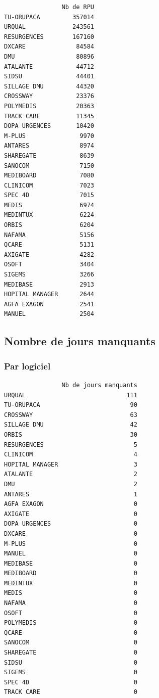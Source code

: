 \documentclass[]{article}
\begin{document}
\begin{verbatim}
                Nb de RPU
TU-ORUPACA         357014
URQUAL             243561
RESURGENCES        167160
DXCARE              84584
DMU                 80896
ATALANTE            44712
SIDSU               44401
SILLAGE DMU         44320
CROSSWAY            23376
POLYMEDIS           20363
TRACK CARE          11345
DOPA URGENCES       10420
M-PLUS               9970
ANTARES              8974
SHAREGATE            8639
SANOCOM              7150
MEDIBOARD            7080
CLINICOM             7023
SPEC 4D              7015
MEDIS                6974
MEDINTUX             6224
ORBIS                6204
NAFAMA               5156
QCARE                5131
AXIGATE              4282
OSOFT                3404
SIGEMS               3266
MEDIBASE             2913
HOPITAL MANAGER      2644
AGFA EXAGON          2541
MANUEL               2504
\end{verbatim}

\subsection{Nombre de jours manquants}\label{nombre-de-jours-manquants}

\subsubsection{Par logiciel}\label{par-logiciel}

\begin{verbatim}
                Nb de jours manquants
URQUAL                            111
TU-ORUPACA                         90
CROSSWAY                           63
SILLAGE DMU                        42
ORBIS                              30
RESURGENCES                         5
CLINICOM                            4
HOPITAL MANAGER                     3
ATALANTE                            2
DMU                                 2
ANTARES                             1
AGFA EXAGON                         0
AXIGATE                             0
DOPA URGENCES                       0
DXCARE                              0
M-PLUS                              0
MANUEL                              0
MEDIBASE                            0
MEDIBOARD                           0
MEDINTUX                            0
MEDIS                               0
NAFAMA                              0
OSOFT                               0
POLYMEDIS                           0
QCARE                               0
SANOCOM                             0
SHAREGATE                           0
SIDSU                               0
SIGEMS                              0
SPEC 4D                             0
TRACK CARE                          0
\end{verbatim}
\end{document}
